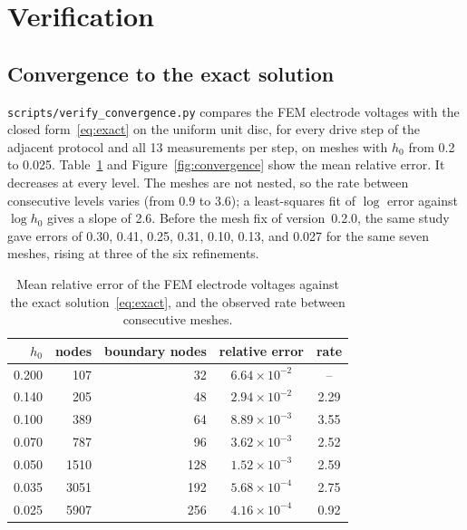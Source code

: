 \documentclass[11pt,a4paper]{article}
\newcommand{\code}[1]{\texttt{#1}}
\begin{document}
\section{Verification}\label{sec:verification}

\subsection{Convergence to the exact solution}

\code{scripts/verify\_convergence.py} compares the FEM electrode voltages with
the closed form~\eqref{eq:exact} on the uniform unit disc, for every drive
step of the adjacent protocol and all 13 measurements per step, on meshes
with $h_0$ from 0.2 to 0.025. Table~\ref{tab:convergence} and
Figure~\ref{fig:convergence} show the mean relative error. It decreases at
every level. The meshes are not nested, so the rate between consecutive
levels varies (from 0.9 to 3.6); a least-squares fit of $\log$ error against
$\log h_0$ gives a slope of 2.6. Before the mesh fix of version~0.2.0, the
same study gave errors of 0.30, 0.41, 0.25, 0.31, 0.10, 0.13, and 0.027 for
the same seven meshes, rising at three of the six refinements.

\begin{table}[ht]
\centering
\caption{Mean relative error of the FEM electrode voltages against the exact
solution~\eqref{eq:exact}, and the observed rate between consecutive meshes.}
\label{tab:convergence}
\begin{tabular}{rrrcc}
\toprule
$h_0$ & nodes & boundary nodes & relative error & rate \\
\midrule
0.200 &  107 &  32 & $6.64\times10^{-2}$ & --   \\
0.140 &  205 &  48 & $2.94\times10^{-2}$ & 2.29 \\
0.100 &  389 &  64 & $8.89\times10^{-3}$ & 3.55 \\
0.070 &  787 &  96 & $3.62\times10^{-3}$ & 2.52 \\
0.050 & 1510 & 128 & $1.52\times10^{-3}$ & 2.59 \\
0.035 & 3051 & 192 & $5.68\times10^{-4}$ & 2.75 \\
0.025 & 5907 & 256 & $4.16\times10^{-4}$ & 0.92 \\
\bottomrule
\end{tabular}
\end{table}
\end{document}
